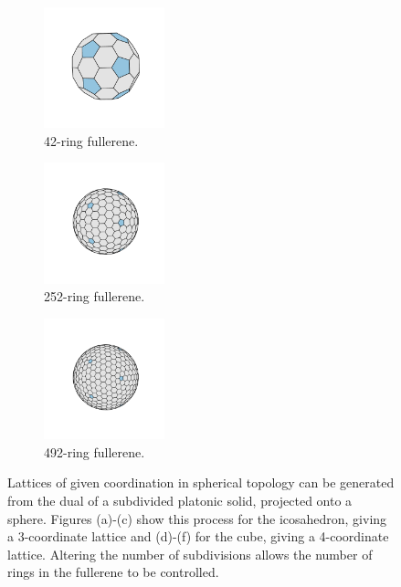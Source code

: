\begin{figure}[bt]
     \vspace{0.2cm}
     \begin{subfigure}[b]{0.3\textwidth}
         \centering
         \includegraphics[height=3.5cm]{./figures/general_networks/full42.pdf}
         \caption{42\--ring fullerene.}
         \label{fig:topo7}
     \end{subfigure}
     \hfill
     \begin{subfigure}[b]{0.3\textwidth}
         \centering
         \includegraphics[height=3.5cm]{./figures/general_networks/full252.pdf}
         \caption{252\--ring fullerene.}
         \label{fig:topo8}
     \end{subfigure}
     \hfill
     \begin{subfigure}[b]{0.3\textwidth}
         \centering
         \includegraphics[height=3.5cm]{./figures/general_networks/full492.pdf}
         \caption{492\--ring fullerene.}
         \label{fig:topo9}
     \end{subfigure}
     \hfill
     
     \caption{Lattices of given coordination in spherical topology can be generated from the dual of a subdivided platonic solid, projected onto a sphere. Figures (a)\--(c) show this process for the icosahedron, giving a 3\--coordinate lattice and (d)\--(f) for the cube, giving a 4\--coordinate lattice. Altering the number of subdivisions allows the number of rings in the fullerene to be controlled.}
     \label{fig:topomethod}
\end{figure}

